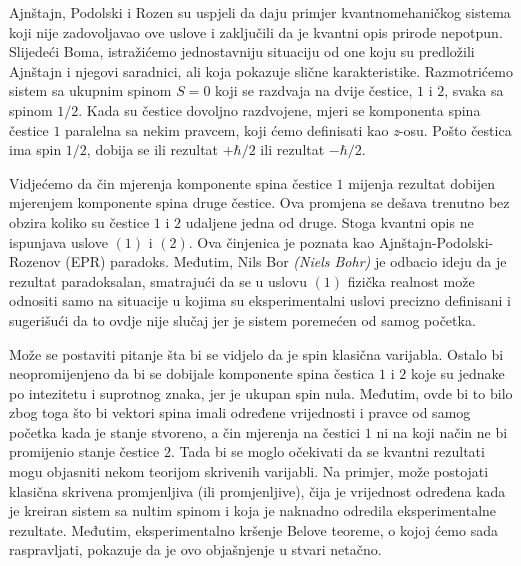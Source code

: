 Ajnštajn, Podolski i Rozen su uspjeli da daju primjer kvantnomehaničkog sistema koji
nije zadovoljavao ove uslove i zaključili da je kvantni opis prirode nepotpun.
Slijedeći Boma, istražićemo jednostavniju situaciju od one koju su predložili Ajnštajn
i njegovi saradnici, ali koja pokazuje slične karakteristike. Razmotri\' cemo sistem sa
ukupnim spinom $S = 0$ koji se razdvaja na dvije čestice, $1$ i $2$, svaka sa
spinom $1/2$. Kada su čestice dovoljno razdvojene, mjeri se komponenta spina čestice $1$
paralelna sa nekim pravcem, koji ćemo definisati kao {\it{z}}-osu. Pošto čestica ima spin
$1/2$, dobija se ili rezultat $+\hbar/2$ ili rezultat $-\hbar/2$.

Vidje\' cemo da čin mjerenja komponente spina čestice $1$ mijenja
rezultat dobijen mjerenjem komponente spina druge čestice. Ova promjena se dešava
trenutno bez obzira koliko su čestice $1$ i $2$ udaljene jedna od druge. Stoga kvantni
opis ne ispu\-njava uslove $(1)$ i $(2)$. Ova činjenica je poznata kao
Ajnštajn-Podolski-Rozenov (EPR) paradoks. Međutim, Nils Bor {\it{(Niels Bohr)}} je odbacio
ideju da je rezultat paradoksalan, smatrajući da se u uslovu $(1)$ fizička realnost
može odnositi samo na situacije u kojima su eksperimentalni uslovi precizno definisani i sugerišući da to ovdje nije slučaj jer je sistem poremećen od samog početka.

Može se postaviti pitanje šta bi se vidjelo da je spin klasična
varijabla. Ostalo bi neopromijenjeno da bi se dobijale komponente spina čestica $1$ i $2$ koje
su jednake po intezitetu i suprotnog znaka, jer je ukupan spin nula. Međutim, ovde bi to bilo zbog toga što bi
vektori spina imali određene vrijednosti i pravce od samog početka kada je stanje stvoreno, a čin mjerenja na čestici $1$ ni na koji način ne bi promijenio stanje čestice
$2$. Tada bi se moglo očekivati da se kvantni rezultati mogu objasniti nekom teorijom skrivenih varijabli. Na primjer, može postojati klasična skrivena promjenljiva (ili
promjenljive), čija je vrijednost određena kada je kreiran sistem sa nultim spinom i koja je
naknadno odredila eksperimentalne rezultate. Međutim, eksperimentalno kršenje Belove
teoreme, o kojoj ćemo sada raspravljati, pokazuje da je ovo objašnjenje u stvari
netačno.